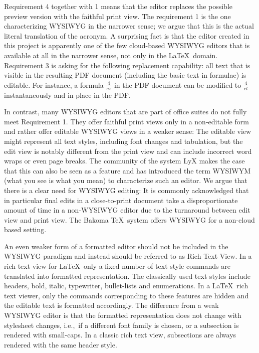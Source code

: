\documentclass[sigconf]{acmart}
\newcommand{\ie}{i.e.,\ }
\begin{document}
Requirement 4 together with 1 means that the editor replaces the possible preview version with the faithful print view.
The requirement 1 is the one characterizing WYSIWYG in the narrower sense; we argue that this is the actual literal translation of the acronym.
A surprising fact is that the editor created in this project is apparently one of the few cloud-based WYSIWYG editors that is available at all in the narrower sense, not only in the \LaTeX\ domain.
Requirement 3 is asking for the following replacement capability: all text that is visible in the resulting PDF document (including the basic text in formulae) is editable.  For instance, a formula $\frac{4}{cx}$ in the PDF document can be modified to $\frac{4}{ct}$ instantaneously and in place in the PDF. 

In contrast, many WYSIWYG editors that are part of office suites do not fully meet Requirement 1. 
They offer faithful print views only in a non-editable form and rather offer editable WYSIWYG views in a weaker sense: 
The editable view might represent all text styles, including font changes and tabulation, but the edit view is notably different from the print view and can include incorrect word wraps or even page breaks. 
The community of the system LyX makes the case that this can also be seen as a feature and has introduced the term WYSIWYM (what you see is what you mean) to characterize such an editor.
We argue that there is a clear need for WYSIWYG editing: It is commonly acknowledged that in particular final edits in a close-to-print document take a disproportionate amount of time in a non-WYSIWYG editor due  to the turnaround between edit view and print view.   The Bakoma \TeX\ system offers WYSIWYG for a non-cloud based setting.

An even weaker form of a formatted editor should not be included in the WYSIWYG paradigm and instead should be referred to as Rich Text View. 
In a rich text view for \LaTeX\  only a fixed number of text style commands are translated into formatted representation. 
The classically used text styles include headers, bold, italic, typewriter, bullet-lists and enumerations. 
In a \LaTeX\ rich text viewer, only the commands corresponding to these features are hidden and the editable text is formatted accordingly. 
The difference from a weak WYSIWYG editor is that the formatted representation does not change with stylesheet changes, \ie if a different font family is chosen, or a subsection is rendered with small-caps. 
In a classic rich text view, subsections are always rendered with the same header style.
\end{document}

